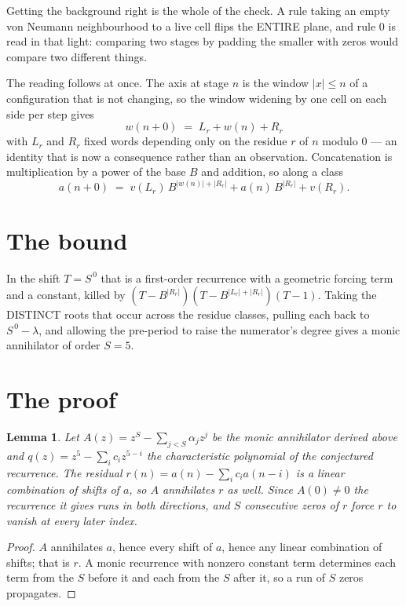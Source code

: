 \documentclass[11pt,a4paper]{article}
\theoremstyle{plain}
\newtheorem{lemma}[theorem]{Lemma}
\theoremstyle{definition}
\begin{document}
Getting the background right is the whole of the check. A rule taking an empty von Neumann
neighbourhood to a live cell flips the ENTIRE plane, and rule 0 is read
in that light: comparing two stages by padding the smaller with zeros would compare two
different things.

The reading follows at once. The axis at stage $n$ is the window $|x|\le n$ of a configuration
that is not changing, so the window widening by one cell on each side per step gives
\[
w(n+0)\;=\;L_r + w(n) + R_r
\]
with $L_r$ and $R_r$ fixed words depending only on the residue $r$ of $n$ modulo $0$ --- an
identity that is now a consequence rather than an observation. Concatenation is multiplication
by a power of the base $B$ and addition, so along a class
\[
a(n+0)\;=\;v(L_r)\,B^{|w(n)|+|R_r|} + a(n)\,B^{|R_r|} + v(R_r).
\]

\section{The bound}

In the shift $T=S^{\,0}$ that is a first-order recurrence with a geometric forcing term and a
constant, killed by $(T-B^{|R_r|})(T-B^{|L_r|+|R_r|})(T-1)$. Taking the DISTINCT roots that
occur across the residue classes, pulling each back to $S^{\,0}-\lambda$, and allowing the
pre-period to raise the numerator's degree gives a monic annihilator of order $S=5$.

\section{The proof}

\begin{lemma}\label{lem:crit}
Let $A(z)=z^S-\sum_{j<S}\alpha_jz^{j}$ be the monic annihilator derived above and
$q(z)=z^{5}-\sum_ic_iz^{5-i}$ the characteristic polynomial of the conjectured
recurrence. The residual $r(n)=a(n)-\sum_ic_ia(n-i)$ is a linear combination of shifts of $a$,
so $A$ annihilates $r$ as well. Since $A(0)\ne0$ the recurrence it gives runs in both
directions, and $S$ consecutive zeros of $r$ force $r$ to vanish at every later index.
\end{lemma}

\begin{proof}
$A$ annihilates $a$, hence every shift of $a$, hence any linear combination of shifts; that is
$r$. A monic recurrence with nonzero constant term determines each term from the $S$ before it
and each from the $S$ after it, so a run of $S$ zeros propagates.
\end{proof}
\end{document}
